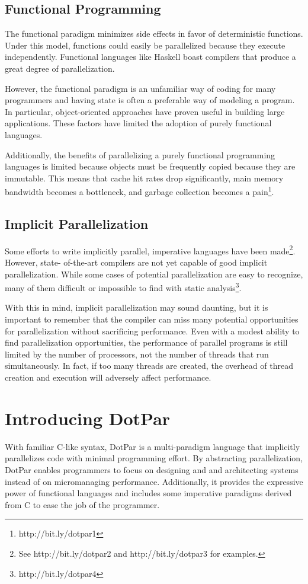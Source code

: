 \subsection{Functional Programming}
The functional paradigm minimizes side effects in favor of
deterministic functions. Under this model, functions could easily be
parallelized because they execute independently. Functional languages
like Haskell boast compilers that produce a great degree of
parallelization.

However, the functional paradigm is an unfamiliar way of coding for
many programmers and having state is often a preferable way of
modeling a program. In particular, object-oriented approaches have
proven useful in building large applications. These factors have
limited the adoption of purely functional languages.

Additionally, the benefits of parallelizing a purely functional
programming languages is limited because objects must be frequently
copied because they are immutable. This means that cache hit rates
drop significantly, main memory bandwidth becomes a bottleneck, and
garbage collection becomes a pain\footnote{http://bit.ly/dotpar1}.

\subsection{Implicit Parallelization}
Some efforts to write implicitly parallel, imperative languages have
been made\footnote{See http://bit.ly/dotpar2 and http://bit.ly/dotpar3
  for examples.}. However, state- of-the-art compilers are not yet
capable of good implicit parallelization. While some cases of
potential parallelization are easy to recognize, many of them
difficult or impossible to find with static
analysis\footnote{http://bit.ly/dotpar4}.

With this in mind, implicit parallelization may sound daunting, but it
is important to remember that the compiler can miss many potential
opportunities for parallelization without sacrificing
performance. Even with a modest ability to find parallelization
opportunities, the performance of parallel programs is still limited
by the number of processors, not the number of threads that run
simultaneously. In fact, if too many threads are created, the overhead
of thread creation and execution will adversely affect performance.

\section{Introducing DotPar}
With familiar C-like syntax, DotPar is a multi-paradigm language that
implicitly parallelizes code with minimal programming effort. By
abstracting parallelization, DotPar enables programmers to focus
on designing and and architecting systems instead of on micromanaging
performance. Additionally, it provides the expressive power of
functional languages and includes some imperative paradigms derived
from C to ease the job of the programmer.

